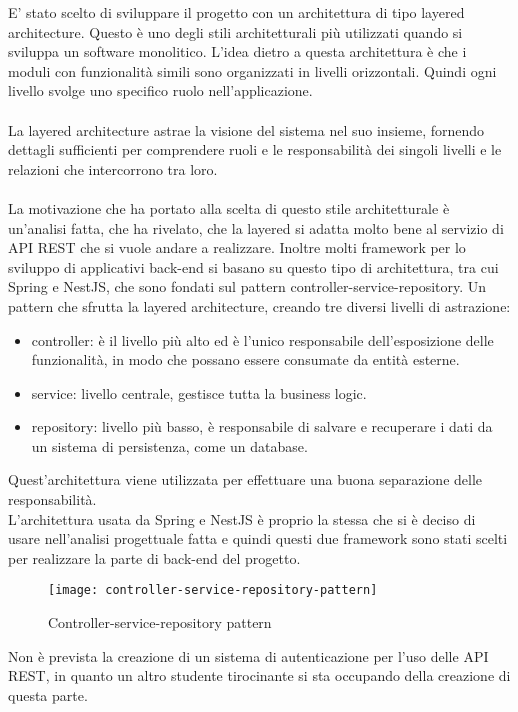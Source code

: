 E' stato scelto di sviluppare il progetto con un architettura di tipo layered architecture. Questo è uno
degli stili architetturali più utilizzati quando si sviluppa un software monolitico. L'idea dietro a 
questa architettura è che i moduli con funzionalità simili sono organizzati in livelli
orizzontali. Quindi ogni livello svolge uno specifico ruolo nell'applicazione.
\\\\
La layered architecture astrae la visione del sistema nel suo insieme, fornendo dettagli 
sufficienti per comprendere ruoli e le responsabilità dei singoli livelli e le relazioni
che intercorrono tra loro.
\\\\
La motivazione che ha portato alla scelta di questo stile architetturale è un'analisi fatta,
che ha rivelato, che la layered si adatta molto bene al servizio di \gls{API} \gls{REST} che
si vuole andare a realizzare. Inoltre molti framework per lo sviluppo di applicativi \gls{back-end} si basano su questo tipo di architettura, tra cui
Spring e NestJS, che sono fondati sul pattern controller-service-repository. Un pattern
che sfrutta la layered architecture, creando tre diversi livelli di astrazione: 
\begin{itemize}
    \item controller: è il livello più alto ed è l'unico responsabile dell'esposizione delle
        funzionalità, in modo che possano essere consumate da entità esterne.
    \item service: livello centrale, gestisce tutta la business logic.
    \item repository: livello più basso, è responsabile di salvare e recuperare i dati da un
        sistema di persistenza, come un database.
\end{itemize}
\clearpage
\leavevmode\newline
Quest'architettura viene utilizzata per effettuare una buona separazione delle responsabilità.
\\
L'architettura usata da Spring e NestJS è proprio la stessa che si è deciso di usare nell'analisi progettuale fatta 
 e quindi questi due framework sono stati scelti per realizzare
la parte di \gls{back-end} del progetto.
\leavevmode\newline
\begin{figure}[H]
    \centering
    \texttt{[image: controller-service-repository-pattern]}
    \caption{Controller-service-repository pattern}
\end{figure}
\leavevmode\newline
Non è prevista la creazione di un sistema di autenticazione per l'uso delle \gls{API} \gls{REST}, in quanto 
un altro studente tirocinante si sta occupando della creazione di questa parte.

